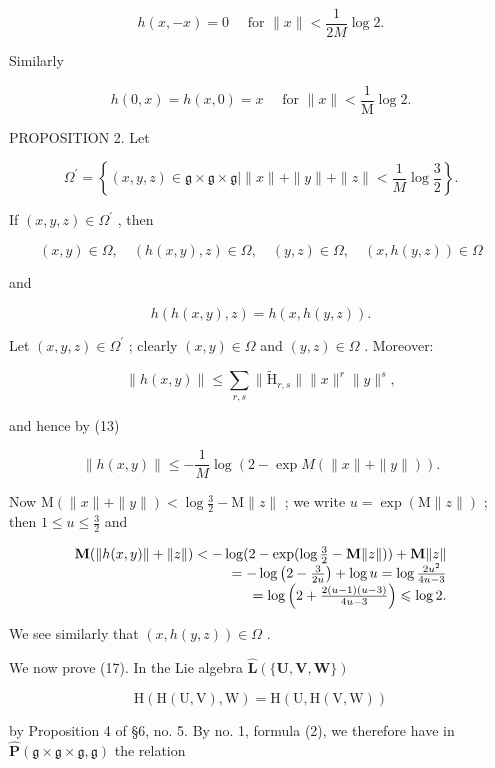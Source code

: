 \[
h (x, - x) = 0 \quad \text { for } \| x \| <   \frac {1}{2 M} \log 2.\tag{14}
\]

Similarly

\[
h (0, x) = h (x, 0) = x \quad \text { for } \| x \| <   \frac {1}{\mathrm{M}} \log 2.\tag{15}
\]

PROPOSITION 2. Let

\[
\Omega^ {\prime} = \left\{(x, y, z) \in \mathfrak {g} \times \mathfrak {g} \times \mathfrak {g} | \| x \| + \| y \| + \| z \| <   \frac {1}{M} \log \frac {3}{2} \right\}.
\]

If \((x,y,z)\in \Omega^{\prime}\) , then

\[
(x, y) \in \Omega , \quad (h (x, y), z) \in \Omega , \quad (y, z) \in \Omega , \quad (x, h (y, z)) \in \Omega\tag{16}
\]

and

\[
h (h (x, y), z) = h (x, h (y, z)).\tag{17}
\]

Let \((x,y,z)\in \Omega^{\prime}\) ; clearly \((x,y)\in \Omega\) and \((y,z)\in \Omega\) . Moreover:

\[
\| h (x, y) \| \leqslant \sum_ {r, s} \| \tilde {\mathrm{H}} _ {r, s} \| \| x \| ^ {r} \| y \| ^ {s},
\]

and hence by (13)

\[
\| h (x, y) \| \leqslant - \frac {1}{M} \log (2 - \exp M (\| x \| + \| y \|)).
\]

Now \(\mathrm{M}(\|x\| + \|y\|) < \log \frac{3}{2} - \mathrm{M}\|z\|\) ; we write \(u = \exp(\mathrm{M}\|z\|)\) ; then \(1 \leqslant u \leqslant \frac{3}{2}\) and

\[
\begin{array}{r l} \mathbf {M} (\| h (x, y) \| + \| z \|) <   - \log (2 - \exp (\log \frac {3}{2} - \mathbf {M} \| z \|)) + \mathbf {M} \| z \| \\ = - \log \left(2 - \frac {3}{2 u}\right) + \log u = \log \frac {2 u ^ {2}}{4 u - 3} \\ = \log \left(2 + \frac {2 (u - 1) (u - 3)}{4 u - 3}\right) \leqslant \log 2. \end{array}
\]

We see similarly that \((x, h(y, z)) \in \Omega\) .

We now prove (17). In the Lie algebra \(\hat{\mathbf{L}}(\{\mathbf{U},\mathbf{V},\mathbf{W}\})\)

\[
\mathrm{H} (\mathrm{H} (\mathrm{U}, \mathrm{V}), \mathrm{W}) = \mathrm{H} (\mathrm{U}, \mathrm{H} (\mathrm{V}, \mathrm{W}))
\]

by Proposition 4 of §6, no. 5. By no. 1, formula (2), we therefore have in \(\hat{\mathbf{P}}(\mathfrak{g} \times \mathfrak{g} \times \mathfrak{g}, \mathfrak{g})\) the relation

